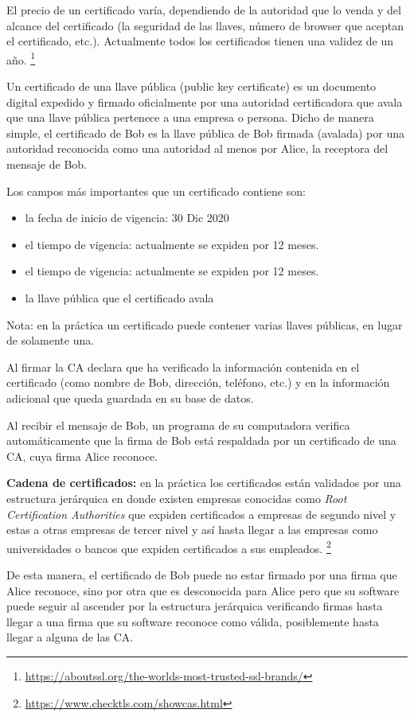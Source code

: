 \documentclass[12pt]{report} %
\begin{document}
\begin{itemize}
El precio de un certificado varía, dependiendo de la autoridad que lo venda y del alcance del certificado (la seguridad de las llaves, número de browser que aceptan el certificado, etc.). Actualmente todos los certificados tienen una validez de un año. \footnote{\url{ https://aboutssl.org/the-worlds-most-trusted-ssl-brands/}}

Un certificado de una llave pública (public key certificate) es un documento digital expedido y firmado oficialmente por una autoridad certificadora que avala que una llave pública pertenece a una empresa o persona.  Dicho de manera simple, el certificado de Bob es la llave pública de Bob firmada (avalada) por una autoridad reconocida como una autoridad al menos por Alice, la receptora del mensaje de Bob.

Los campos más importantes que un certificado contiene son:

\begin{itemize}
    \item la fecha de inicio de vigencia: 30 Dic 2020
    \item el tiempo de vigencia: actualmente se expiden por 12 meses.
    \item el tiempo de vigencia: actualmente se expiden por 12 meses.
    \item la llave pública que el certificado avala
\end{itemize}

 Nota: en la práctica un certificado puede contener varias llaves públicas, en lugar de solamente una.

Al firmar la CA declara que ha verificado la información contenida en el certificado (como nombre de Bob, dirección, teléfono, etc.) y en la información adicional que queda guardada en su base de datos. 

Al recibir el mensaje de Bob, un programa de su computadora verifica automáticamente que la firma de Bob está respaldada por un certificado de una CA, cuya firma Alice reconoce.

\textbf{Cadena de certificados:} en la práctica los certificados están validados por una estructura jerárquica en donde existen empresas conocidas como \textit{Root Certification Authorities} que expiden certificados a empresas de segundo nivel y estas a otras empresas de tercer nivel y así hasta llegar a las empresas como universidades o bancos que expiden certificados a sus empleados. \footnote{\url{https://www.checktls.com/showcas.html}}

De esta manera, el certificado de Bob puede no estar firmado por una firma que Alice reconoce, sino por otra que es desconocida para Alice pero que su software puede seguir al ascender por la estructura jerárquica verificando firmas hasta llegar a una firma que su software reconoce como válida, posiblemente hasta llegar a alguna de las CA.


\end{itemize}
\end{document}
